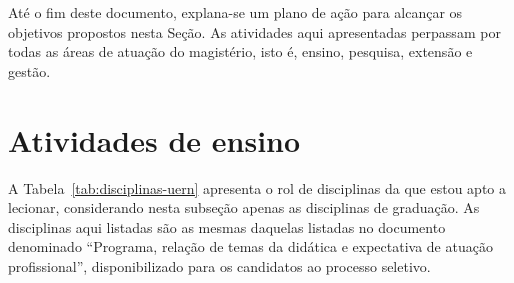 \documentclass{article}
\begin{document}
Até o fim deste documento, explana-se um plano de ação para alcançar os objetivos propostos nesta Seção. As atividades aqui apresentadas perpassam por todas as áreas de atuação do magistério, isto é, ensino, pesquisa, extensão e gestão.

\section{Atividades de ensino}

A Tabela~\ref{tab:disciplinas-uern} apresenta o rol de disciplinas da  que estou apto a lecionar, considerando nesta subseção apenas as disciplinas de graduação. As disciplinas aqui listadas são as mesmas daquelas listadas no documento denominado ``Programa, relação de temas da didática e expectativa de atuação profissional'', disponibilizado para os candidatos ao processo seletivo.
\end{document}
